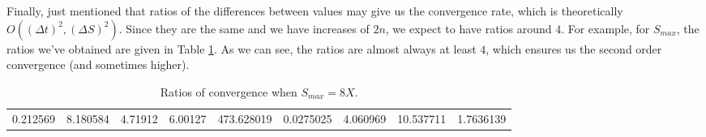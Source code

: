Finally, just mentioned that ratios of the differences between values may give us the convergence rate, which is theoretically $O((\Delta t)^2, (\Delta S)^2)$. Since they are the same and we have increases of $2n$, we expect to have ratios around $4$. For example, for $S_{max}$, the ratios we've obtained are given in Table \ref{table5}. As we can see, the ratios are almost always at least $4$, which ensures us the second order convergence (and sometimes higher).
\begin{table}[h!]\small
	\setlength{\tabcolsep}{7pt}
	\renewcommand{\arraystretch}{1.4}
\begin{tabular}{ccccccccc}\hline
	0.212569 & 8.180584& 4.71912& 6.00127& 473.628019& 0.0275025& 4.060969& 10.537711& 1.7636139
\end{tabular}
\vspace{0.2cm}
	\caption{Ratios of convergence when $S_{max} = 8X$.}\label{table5}
\end{table}